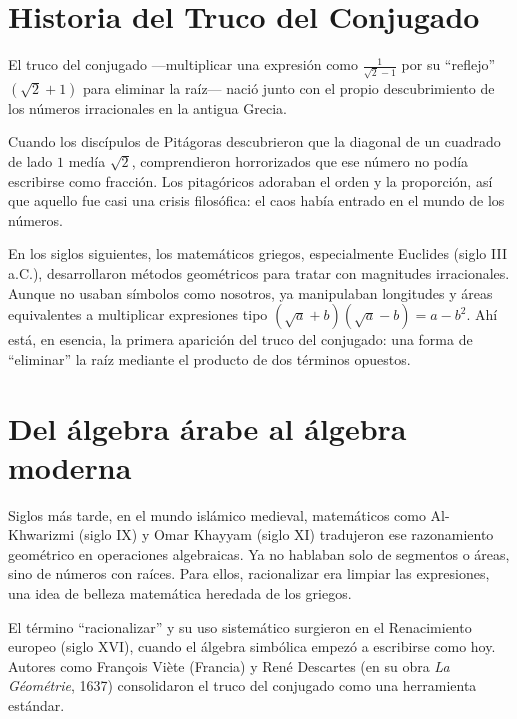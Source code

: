 
\vspace{0.5cm}

\vspace{1em} %
\section*{Historia del Truco del Conjugado}

\begin{reseñaplana}
El truco del conjugado —multiplicar una expresión como $\tfrac{1}{\sqrt{2}-1}$ por su “reflejo” $(\sqrt{2}+1)$ 
para eliminar la raíz— nació junto con el propio descubrimiento de los números irracionales en la antigua Grecia.

Cuando los discípulos de Pitágoras descubrieron que la diagonal de un cuadrado de lado $1$ medía $\sqrt{2}$, 
comprendieron horrorizados que ese número no podía escribirse como fracción. Los pitagóricos adoraban el orden y 
la proporción, así que aquello fue casi una crisis filosófica: el caos había entrado en el mundo de los números.

En los siglos siguientes, los matemáticos griegos, especialmente Euclides (siglo III a.C.), desarrollaron métodos 
geométricos para tratar con magnitudes irracionales. Aunque no usaban símbolos como nosotros, ya manipulaban longitudes 
y áreas equivalentes a multiplicar expresiones tipo $(\sqrt{a}+b)(\sqrt{a}-b)=a-b^{2}$. Ahí está, en esencia, la primera 
aparición del truco del conjugado: una forma de “eliminar” la raíz mediante el producto de dos términos opuestos.
\end{reseñaplana}

\section*{Del álgebra árabe al álgebra moderna}

\begin{reseñaplana}
Siglos más tarde, en el mundo islámico medieval, matemáticos como Al-Khwarizmi (siglo IX) y Omar Khayyam (siglo XI) 
tradujeron ese razonamiento geométrico en operaciones algebraicas. Ya no hablaban solo de segmentos o áreas, sino de 
números con raíces. Para ellos, racionalizar era limpiar las expresiones, una idea de belleza matemática heredada de los griegos.

El término “racionalizar” y su uso sistemático surgieron en el Renacimiento europeo (siglo XVI), cuando el álgebra 
simbólica empezó a escribirse como hoy. Autores como François Viète (Francia) y René Descartes (en su obra \textit{La Géométrie}, 1637) 
consolidaron el truco del conjugado como una herramienta estándar.
\end{reseñaplana}

